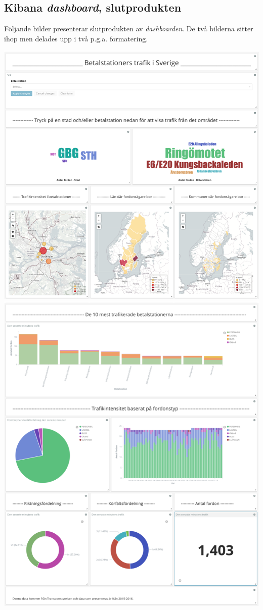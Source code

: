 \documentclass[12pt]{kththesis}
\begin{document}
\begin{appendices}
\section{Kibana \textit{dashboard}, slutprodukten}
Följande bilder presenterar slutprodukten av \textit{dashboarden}. De två bilderna sitter ihop men delades upp i två p.g.a. formatering.

\includegraphics[width=1\textwidth]{Dashboard1}
\newpage
\includegraphics[width=1\textwidth]{Dashboard2}

\end{appendices}

\afterpage{\null\newpage}


\end{document}
